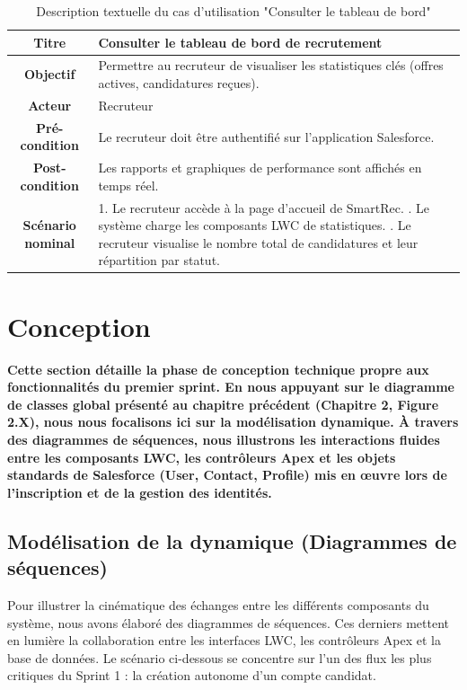     \begin{table}[H]
    \caption{Description textuelle du cas d’utilisation "Consulter le tableau de bord"}
    \centering
    \begin{tabular}{|c|p{12cm}|}
    \hline
    \textbf{Titre} & Consulter le tableau de bord de recrutement \\
    \hline
    \textbf{Objectif} & Permettre au recruteur de visualiser les statistiques clés (offres actives, candidatures reçues). \\
    \hline
    \textbf{Acteur}& Recruteur \\
    \hline
    \textbf{Pré-condition} & Le recruteur doit être authentifié sur l'application Salesforce. \\
    \hline
    \textbf{Post-condition} & Les rapports et graphiques de performance sont affichés en temps réel.\\
    \hline
    \textbf{Scénario nominal} & 1. Le recruteur accède à la page d'accueil de SmartRec. \newline
    2. Le système charge les composants LWC de statistiques. \newline
    3. Le recruteur visualise le nombre total de candidatures et leur répartition par statut. \\
    \hline
    \end{tabular}
    \label{tab:uc_dashboard}
\end{table}






\section{Conception}
\hspace{0.5cm}\textbf{Cette section détaille la phase de conception technique propre aux fonctionnalités du premier sprint. En nous appuyant sur le diagramme de classes global présenté au chapitre précédent (Chapitre 2, Figure 2.X), nous nous focalisons ici sur la modélisation dynamique. À travers des diagrammes de séquences, nous illustrons les interactions fluides entre les composants LWC, les contrôleurs Apex et les objets standards de Salesforce (User, Contact, Profile) mis en œuvre lors de l'inscription et de la gestion des identités.}








\subsection{Modélisation de la dynamique (Diagrammes de séquences)}
Pour illustrer la cinématique des échanges entre les différents composants du système, nous avons élaboré des diagrammes de séquences. Ces derniers mettent en lumière la collaboration entre les interfaces LWC, les contrôleurs Apex et la base de données. Le scénario ci-dessous se concentre sur l'un des flux les plus critiques du Sprint 1 : la création autonome d'un compte candidat.

